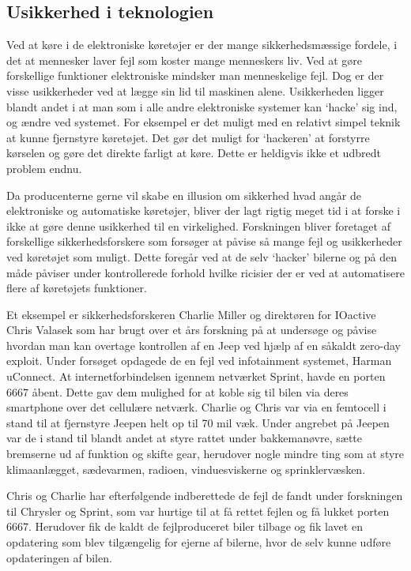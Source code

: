 \subsection{Usikkerhed i teknologien}
Ved at køre i de elektroniske køretøjer er der mange sikkerhedsmæssige fordele, i det at mennesker laver fejl som koster mange menneskers liv. Ved at gøre forskellige funktioner elektroniske mindsker man menneskelige fejl. Dog er der visse usikkerheder ved at lægge sin lid til maskinen alene. Usikkerheden ligger blandt andet i at man som i alle andre elektroniske systemer kan `hacke' sig ind, og ændre ved systemet. For eksempel er det muligt med en relativt simpel teknik at kunne fjernstyre køretøjet. Det gør det muligt for `hackeren' at forstyrre kørselen og gøre det direkte farligt at køre. Dette er heldigvis ikke et udbredt problem endnu.  

Da producenterne gerne vil skabe en illusion om sikkerhed hvad angår de elektroniske og automatiske køretøjer, bliver der lagt rigtig meget tid i at forske i ikke at gøre denne usikkerhed til en virkelighed. Forskningen bliver foretaget af forskellige sikkerhedsforskere som forsøger at påvise så mange fejl og usikkerheder ved køretøjet som muligt. Dette foregår ved at de selv `hacker' bilerne og på den måde påviser under kontrollerede forhold hvilke ricisier der er ved at automatisere flere af køretøjets funktioner.  


Et eksempel er sikkerhedsforskeren Charlie Miller og direktøren for IOactive Chris Valasek som har brugt over et års forskning på at undersøge og påvise hvordan man kan overtage kontrollen af en Jeep ved hjælp af en såkaldt zero-day exploit. Under forsøget opdagede de en fejl ved infotainment systemet, Harman uConnect. At internetforbindelsen igennem netværket Sprint, havde en porten 6667 åbent. Dette gav dem mulighed for at koble sig til bilen via deres smartphone over det cellulære netværk. Charlie og Chris var via en femtocell i stand til at fjernstyre Jeepen helt op til 70 mil væk. Under angrebet på Jeepen var de i stand til blandt andet at styre rattet under bakkemanøvre, sætte bremserne ud af funktion og skifte gear, herudover nogle mindre ting som at styre klimaanlægget, sædevarmen, radioen, vinduesviskerne og sprinklervæsken.  

Chris og Charlie har efterfølgende indberettede de fejl de fandt under forskningen til Chrysler og Sprint, som var hurtige til at få rettet fejlen og få lukket porten 6667. Herudover fik de kaldt de fejlproduceret biler tilbage og fik lavet en opdatering som blev tilgængelig for ejerne af bilerne, hvor de selv kunne udføre opdateringen af bilen.   

